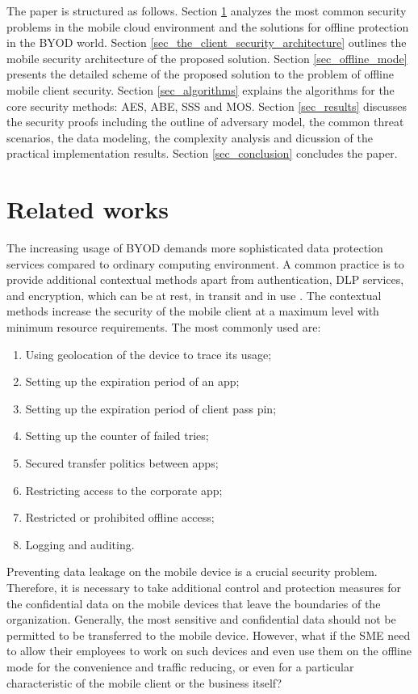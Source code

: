 \documentclass[twocolumn]{svjour3}          	%
\begin{document}
The paper is structured as follows. Section \ref{sec_related_works} analyzes the most common security problems in the mobile cloud environment and the solutions for offline protection in the BYOD world. Section \ref{sec_the_client_security_architecture} outlines the mobile security architecture of the proposed solution. Section \ref{sec_offline_mode} presents the detailed scheme of the proposed solution to the problem of offline mobile client security. Section \ref{sec_algorithms} explains the algorithms for the core security methods: AES, ABE, SSS and MOS. Section \ref{sec_results} discusses the security proofs including the outline of adversary model, the common threat scenarios, the data modeling, the complexity analysis and dicussion of the practical implementation results. Section \ref{sec_conclusion} concludes the paper.

\section{Related works}
\label{sec_related_works}
The increasing usage of BYOD demands more sophisticated data protection services compared to ordinary computing environment. A common practice is to provide additional contextual methods apart from authentication, DLP services, and encryption, which can be at rest, in transit and in use \cite{yovel2014, khan2015cloud, khan2014survey, khan2013towards}. The contextual methods increase the security of the mobile client at a maximum level with minimum resource requirements. The most commonly used are:

\begin{enumerate}
	\item Using geolocation of the device to trace its usage;
	\item Setting up the expiration period of an app;
	\item Setting up the expiration period of client pass pin;
	\item Setting up the counter of failed tries;
	\item Secured transfer politics between apps;
	\item Restricting access to the corporate app;
	\item Restricted or prohibited offline access;
	\item Logging and auditing.
\end{enumerate}

Preventing data leakage on the mobile device is a crucial security problem. Therefore, it is necessary to take additional control and protection measures for the confidential data on the mobile devices that leave the boundaries of the organization. Generally, the most sensitive and confidential data should not be permitted to be transferred to the mobile device. However, what if the SME need to allow their employees to work on such devices and even use them on the offline mode for the convenience and traffic reducing, or even for a particular characteristic of the mobile client or the business itself?
\end{document}

